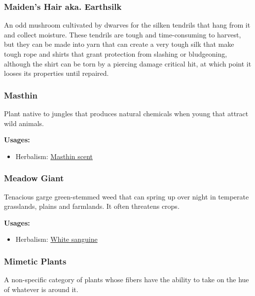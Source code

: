 \subsubsection{Maiden's Hair aka. Earthsilk}

An odd mushroom cultivated by dwarves for the silken tendrils that hang from it and collect moisture. These tendrils are tough and time-consuming to harvest, but they can be made into yarn that can create a very tough silk that make tough rope and shirts that grant protection from slashing or bludgeoning, although the shirt can be torn by a piercing damage critical hit, at which point it looses its properties until repaired.

\subsubsection{Masthin}
\label{Masthin}

Plant native to jungles that produces natural chemicals when young that attract wild animals.

\vspace{5mm}

\textbf{Usages:}

\begin{itemize}[noitemsep]
\item[] Herbalism: \hyperref[Masthin scent]{Masthin scent}
\end{itemize}

\subsubsection{Meadow Giant}
\label{Meadow Giant}

Tenacious garge green-stemmed weed that can spring up over night in temperate grasslands, plains and farmlands. It often threatens crops.

\vspace{5mm}

\textbf{Usages:}

\begin{itemize}[noitemsep]
\item[] Herbalism: \hyperref[White sanguine]{White sanguine}
\end{itemize}

\subsubsection{Mimetic Plants}

A non-specific category of plants whose fibers have the ability to take on the hue of whatever is around it.

